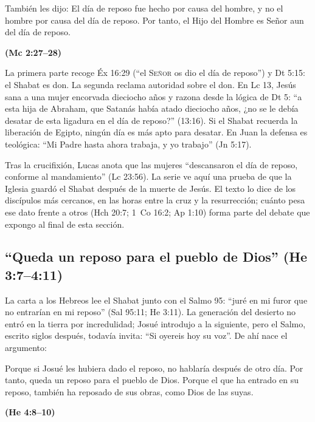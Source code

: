 \documentclass[11pt,letterpaper]{article}
\newcommand{\SENOR}{\textsc{Señor}}
\newcommand{\fuente}[1]{\par\hfill{\upshape\bfseries\small\textcolor{tierraroja}{#1}}}
\begin{document}
\begin{cita}También les dijo: El día de reposo fue hecho por causa del hombre, y no el hombre por causa del día de reposo. Por tanto, el Hijo del Hombre es Señor aun del día de reposo.\fuente{(Mc 2:27--28)}\end{cita}

La primera parte recoge Éx 16:29 (``el \SENOR{} os dio el día de reposo'') y Dt 5:15: el Shabat es don. La segunda reclama autoridad sobre el don. En Lc 13, Jesús sana a una mujer encorvada dieciocho años y razona desde la lógica de Dt 5: ``a esta hija de Abraham, que Satanás había atado dieciocho años, ¿no se le debía desatar de esta ligadura en el día de reposo?'' (13:16). Si el Shabat recuerda la liberación de Egipto, ningún día es más apto para desatar. En Juan la defensa es teológica: ``Mi Padre hasta ahora trabaja, y yo trabajo'' (Jn 5:17).

Tras la crucifixión, Lucas anota que las mujeres ``descansaron el día de reposo, conforme al mandamiento'' (Lc 23:56). La serie ve aquí una prueba de que la Iglesia guardó el Shabat después de la muerte de Jesús. El texto lo dice de los discípulos más cercanos, en las horas entre la cruz y la resurrección; cuánto pesa ese dato frente a otros (Hch 20:7; 1~Co 16:2; Ap 1:10) forma parte del debate que expongo al final de esta sección.

\subsection{``Queda un reposo para el pueblo de Dios'' (He 3:7--4:11)}
La carta a los Hebreos lee el Shabat junto con el Salmo 95: ``juré en mi furor que no entrarían en mi reposo'' (Sal 95:11; He 3:11). La generación del desierto no entró en la tierra por incredulidad; Josué introdujo a la siguiente, pero el Salmo, escrito siglos después, todavía invita: ``Si oyereis hoy su voz''. De ahí nace el argumento:

\begin{cita}Porque si Josué les hubiera dado el reposo, no hablaría después de otro día. Por tanto, queda un reposo para el pueblo de Dios. Porque el que ha entrado en su reposo, también ha reposado de sus obras, como Dios de las suyas.\fuente{(He 4:8--10)}\end{cita}
\end{document}
